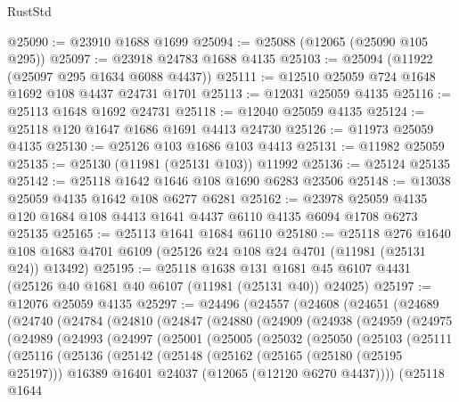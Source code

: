 \begin{lexlean}{RustStd}
\begin{coremodule}
@25090 := @23910 @1688 @1699
@25094 := @25088 (@12065 (@25090 @105 @295))
@25097 := @23918 @24783 @1688 @4135
@25103 := @25094 (@11922 (@25097 @295 @1634 @6088 @4437))
@25111 := @12510 @25059 @724 @1648 @1692 @108 @4437 @24731 @1701
@25113 := @12031 @25059 @4135
@25116 := @25113 @1648 @1692 @24731
@25118 := @12040 @25059 @4135
@25124 := @25118 @120 @1647 @1686 @1691 @4413 @24730
@25126 := @11973 @25059 @4135
@25130 := @25126 @103 @1686 @103 @4413
@25131 := @11982 @25059
@25135 := @25130 (@11981 (@25131 @103)) @11992
@25136 := @25124 @25135
@25142 := @25118 @1642 @1646 @108 @1690 @6283 @23506
@25148 := @13038 @25059 @4135 @1642 @108 @6277 @6281
@25162 := @23978 @25059 @4135 @120 @1684 @108 @4413 @1641 @4437 @6110 @4135 @6094 @1708 @6273 @25135
@25165 := @25113 @1641 @1684 @6110
@25180 := @25118
    @276
    @1640
    @108
    @1683
    @4701
    @6109
    (@25126 @24 @108 @24 @4701 (@11981 (@25131 @24)) @13492)
@25195 := @25118
    @1638
    @131
    @1681
    @45
    @6107
    @4431
    (@25126 @40 @1681 @40 @6107 (@11981 (@25131 @40)) @24025)
@25197 := @12076 @25059 @4135
@25297 := @24496
    (@24557
      (@24608
        (@24651
          (@24689
            (@24740
              (@24784
                (@24810
                  (@24847
                    (@24880
                      (@24909
                        (@24938
                          (@24959
                            (@24975
                              (@24989
                                (@24993
                                  (@24997
                                    (@25001
                                      (@25005
                                        (@25032
                                          (@25050
                                            (@25103
                                              (@25111
                                                (@25116
                                                  (@25136
                                                    (@25142
                                                      (@25148
                                                        (@25162
                                                          (@25165 (@25180 (@25195 @25197)))
                                                          @16389
                                                          @16401
                                                          @24037
                                                          (@12065 (@12120 @6270 @4437))))
                                                      (@25118
                                                        @1644

\end{coremodule}
\end{lexlean}
